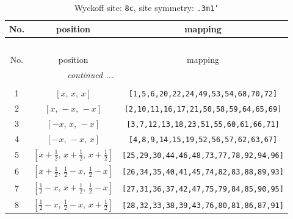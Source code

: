 \documentclass[fleqn,8pt]{jsarticle}
\begin{document}
\begin{longtable}{ccc}
\caption{Wyckoff site: {\tt 8c}, site symmetry: {\tt .3m1'}}
 \\
 \hline \hline
No. & position & mapping \\ \hline \endfirsthead

\multicolumn{2}{l}{\tablename\ \thetable{}} \\
 \hline \hline
No. & position & mapping \\ \hline \endhead

 \hline \hline
\multicolumn{2}{r}{\footnotesize\it continued ...} \\ \endfoot

 \hline \hline
\multicolumn{2}{r}{} \\ \endlastfoot

1 & $\left[ x,\, x,\, x \right]$ & {\tt [1,5,6,20,22,24,49,53,54,68,70,72]} \\ \hline
2 & $\left[ x,\, - x,\, - x \right]$ & {\tt [2,10,11,16,17,21,50,58,59,64,65,69]} \\ \hline
3 & $\left[ - x,\, x,\, - x \right]$ & {\tt [3,7,12,13,18,23,51,55,60,61,66,71]} \\ \hline
4 & $\left[ - x,\, - x,\, x \right]$ & {\tt [4,8,9,14,15,19,52,56,57,62,63,67]} \\ \hline
5 & $\left[ x + \frac{1}{2},\, x + \frac{1}{2},\, x + \frac{1}{2} \right]$ & {\tt [25,29,30,44,46,48,73,77,78,92,94,96]} \\ \hline
6 & $\left[ x + \frac{1}{2},\, \frac{1}{2} - x,\, \frac{1}{2} - x \right]$ & {\tt [26,34,35,40,41,45,74,82,83,88,89,93]} \\ \hline
7 & $\left[ \frac{1}{2} - x,\, x + \frac{1}{2},\, \frac{1}{2} - x \right]$ & {\tt [27,31,36,37,42,47,75,79,84,85,90,95]} \\ \hline
8 & $\left[ \frac{1}{2} - x,\, \frac{1}{2} - x,\, x + \frac{1}{2} \right]$ & {\tt [28,32,33,38,39,43,76,80,81,86,87,91]} \\
\end{longtable}
\renewcommand{\arraystretch}{1.2}
\end{document}

